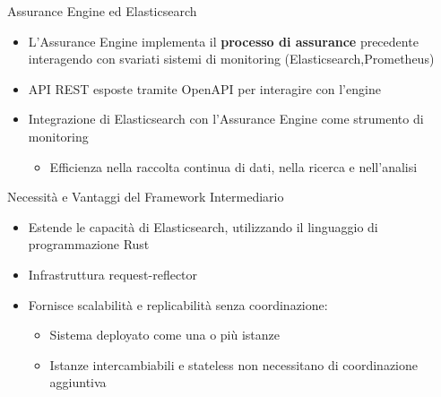 

\begin{frame}{Assurance Engine ed Elasticsearch}
  \begin{itemize}


    \item L'Assurance Engine \alert{implementa} il \textbf{processo di assurance} precedente \alert{interagendo} con svariati \alert{sistemi di monitoring} (Elasticsearch,Prometheus)
   
    \item \alert{API REST} esposte tramite OpenAPI per interagire con l'engine
    
    \item Integrazione di \alert{Elasticsearch} con l'Assurance Engine come \alert{strumento di monitoring}

    \begin{itemize}
      \item Efficienza nella \alert{raccolta continua} di dati, nella \alert{ricerca} e nell'\alert{analisi}
      
    \end{itemize}
  \end{itemize}
\end{frame}


\begin{frame}{Necessità e Vantaggi del Framework Intermediario}
  \begin{itemize}
    \item \alert{Estende} le capacità di Elasticsearch, utilizzando il linguaggio di programmazione \alert{Rust} 
    
    \item Infrastruttura \alert{request-reflector} 
    
    \item Fornisce \alert{scalabilità} e \alert{replicabilità senza coordinazione}:
    
    \begin{itemize}
      \item Sistema deployato come \alert{una o più} istanze

      \item Istanze \alert{intercambiabili} e \alert{stateless} non necessitano di coordinazione aggiuntiva
      
    \end{itemize}
  \end{itemize}
\end{frame}


